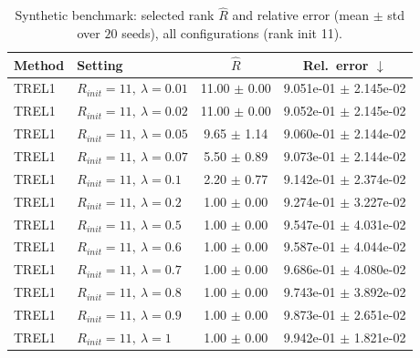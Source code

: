 \begin{table}[t]
\centering
\caption{Synthetic benchmark: selected rank \(\hat R\) and relative error (mean \(\pm\) std over \(20\) seeds), all configurations (rank init 11).}
\label{tab:results_synth_all}
\begin{tabular}{@{}llcc@{}}
\toprule
Method & Setting & \(\hat R\) & Rel.\ error \(\downarrow\) \\ \midrule
TREL1 & \(R_{init}=11,\ \lambda=0.01\) & 11.00 $\pm$ 0.00 & 9.051e-01 $\pm$ 2.145e-02 \\
TREL1 & \(R_{init}=11,\ \lambda=0.02\) & 11.00 $\pm$ 0.00 & 9.052e-01 $\pm$ 2.145e-02 \\
TREL1 & \(R_{init}=11,\ \lambda=0.05\) & 9.65 $\pm$ 1.14 & 9.060e-01 $\pm$ 2.144e-02 \\
TREL1 & \(R_{init}=11,\ \lambda=0.07\) & 5.50 $\pm$ 0.89 & 9.073e-01 $\pm$ 2.144e-02 \\
TREL1 & \(R_{init}=11,\ \lambda=0.1\) & 2.20 $\pm$ 0.77 & 9.142e-01 $\pm$ 2.374e-02 \\
TREL1 & \(R_{init}=11,\ \lambda=0.2\) & 1.00 $\pm$ 0.00 & 9.274e-01 $\pm$ 3.227e-02 \\
TREL1 & \(R_{init}=11,\ \lambda=0.5\) & 1.00 $\pm$ 0.00 & 9.547e-01 $\pm$ 4.031e-02 \\
TREL1 & \(R_{init}=11,\ \lambda=0.6\) & 1.00 $\pm$ 0.00 & 9.587e-01 $\pm$ 4.044e-02 \\
TREL1 & \(R_{init}=11,\ \lambda=0.7\) & 1.00 $\pm$ 0.00 & 9.686e-01 $\pm$ 4.080e-02 \\
TREL1 & \(R_{init}=11,\ \lambda=0.8\) & 1.00 $\pm$ 0.00 & 9.743e-01 $\pm$ 3.892e-02 \\
TREL1 & \(R_{init}=11,\ \lambda=0.9\) & 1.00 $\pm$ 0.00 & 9.873e-01 $\pm$ 2.651e-02 \\
TREL1 & \(R_{init}=11,\ \lambda=1\) & 1.00 $\pm$ 0.00 & 9.942e-01 $\pm$ 1.821e-02 \\
\bottomrule
\end{tabular}
\end{table}